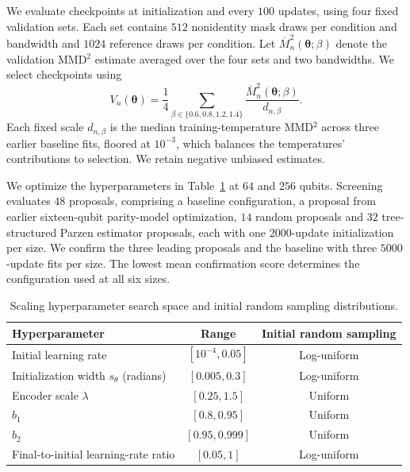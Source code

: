 \documentclass[pra,aps,10pt,twocolumn,floatfix,superscriptaddress, notitlepage,longbibliography]{revtex4-2}
\begin{document}
We evaluate checkpoints at initialization and every $100$ updates, using four fixed validation sets. Each set contains $512$ nonidentity mask draws per condition and bandwidth and $1024$ reference draws per condition. Let $\overline M_n^2(\boldsymbol\theta;\beta)$ denote the validation MMD$^{2}$ estimate averaged over the four sets and two bandwidths. We select checkpoints using
\begin{equation}
V_n(\boldsymbol\theta)=\frac14\sum_{\beta\in\{0.6,0.8,1.2,1.4\}}\frac{\overline M_n^2(\boldsymbol\theta;\beta)}{d_{n,\beta}}.
\label{eq:scaling-selection-score}
\end{equation}
Each fixed scale $d_{n,\beta}$ is the median training-temperature MMD$^{2}$ across three earlier baseline fits, floored at $10^{-3}$, which balances the temperatures' contributions to selection. We retain negative unbiased estimates.

We optimize the hyperparameters in Table~\ref{tab:scaling_hpo_ranges} at $64$ and $256$ qubits. Screening evaluates $48$ proposals, comprising a baseline configuration, a proposal from earlier sixteen-qubit parity-model optimization, $14$ random proposals and $32$ tree-structured Parzen estimator proposals, each with one $2000$-update initialization per size. We confirm the three leading proposals and the baseline with three $5000$-update fits per size. The lowest mean confirmation score determines the configuration used at all six sizes.

\begin{table}[!htbp]
\centering
\caption{Scaling hyperparameter search space and initial random sampling distributions.}
\label{tab:scaling_hpo_ranges}
\small
\begin{tabular}{lcc}
\toprule
Hyperparameter & Range & Initial random sampling \\
\midrule
Initial learning rate & $[10^{-4},0.05]$ & Log-uniform \\
Initialization width $s_\theta$ (radians) & $[0.005,0.3]$ & Log-uniform \\
Encoder scale $\lambda$ & $[0.25,1.5]$ & Uniform \\
$b_1$ & $[0.8,0.95]$ & Uniform \\
$b_2$ & $[0.95,0.999]$ & Uniform \\
Final-to-initial learning-rate ratio & $[0.05,1]$ & Log-uniform \\
\bottomrule
\end{tabular}
\end{table}
\end{document}
